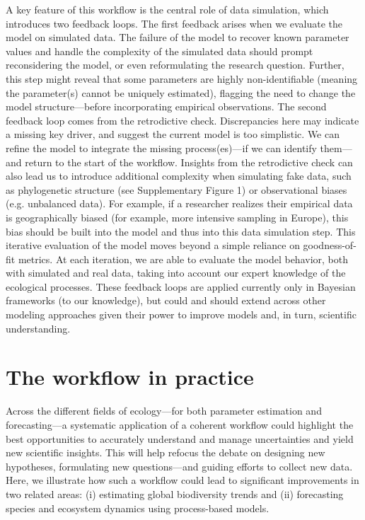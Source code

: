 \documentclass[11pt]{article}
\newcommand{\llabel}[1]{\hypertarget{lintarget:#1}{}\linelabel{lin:#1}}
\begin{document}
A key feature of this workflow is the central role of data simulation, which introduces two feedback loops.
The first feedback arises when we evaluate the model on simulated data.
The failure of the model to recover known parameter values and handle the complexity of the simulated data should prompt reconsidering the model, or even reformulating the research question.
Further, this step might reveal that some parameters are highly non-identifiable (meaning the parameter(s) cannot be uniquely estimated), flagging the need to change the model structure---before incorporating empirical observations. 
The second feedback loop comes from the retrodictive check. 
Discrepancies here may indicate a missing key driver, and suggest the current model is too simplistic. We can refine the model to integrate the missing process(es)---if we can identify them---and return to the start of the workflow. Insights from the retrodictive check can also lead us to introduce additional complexity when simulating fake data, such as phylogenetic structure \llabel{suppfig2}(see Supplementary Figure 1) or observational biases (e.g. unbalanced data). For example, if a researcher realizes their empirical data is geographically biased (for example, more intensive sampling in Europe)\llabel{bias2}, this bias should be built into the model and thus into this data simulation step. This iterative evaluation of the model moves beyond a simple reliance on goodness-of-fit metrics. At each iteration, we are able to evaluate the model behavior, both with simulated and real data, taking into account our expert knowledge of the ecological processes. \llabel{broadcontext}These feedback loops are applied currently only in Bayesian frameworks (to our knowledge), but could and should extend across other modeling approaches given their power to improve models and, in turn, scientific understanding.

\section{The workflow in practice}

Across the different fields of ecology---for both parameter estimation and forecasting---a systematic application of a coherent workflow could highlight the best opportunities to accurately \llabel{quant1}understand and manage uncertainties and yield new scientific insights. This will help refocus the debate on designing new hypotheses, formulating new questions---and guiding efforts to collect new data. Here, we illustrate how such a workflow could lead to significant improvements in two related areas: (i) estimating global biodiversity trends and (ii) forecasting species and ecosystem dynamics using process-based models.
\end{document}
